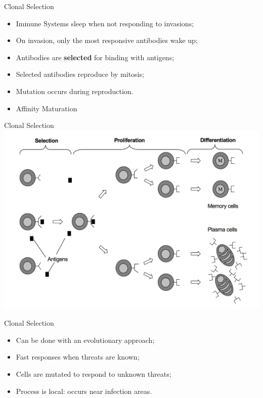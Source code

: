 \documentclass[xcolor=svgnames]{beamer}
\begin{document}
        
        \begin{frame}{Clonal Selection}
            \begin{itemize}
                \item Immune Systems sleep when not responding to invasions;
                \item On invasion, only the most responsive antibodies wake up;
                \item Antibodies are \textbf{selected} for binding with antigens;
                \item Selected antibodies reproduce by mitosis;
                \item Mutation occurs during reproduction.
                \item Affinity Maturation
            \end{itemize}
        \end{frame}
        
        \begin{frame}{Clonal Selection}
            \includegraphics[width=\textwidth]{fig/clonal_selection}
        \end{frame}
        
        \begin{frame}{Clonal Selection}
            \begin{itemize}
                \item Can be done with an evolutionary approach;
                \item Fast responses when threats are known;
                \item Cells are mutated to respond to unknown threats;
                \item Process is local: occurs near infection areas.
            \end{itemize}
        \end{frame}
        
\end{document}
